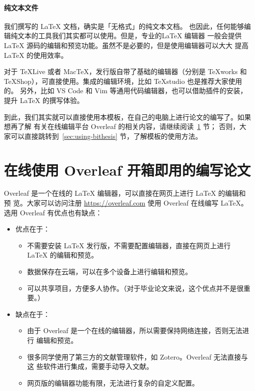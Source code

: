 \paragraph{纯文本文件} 我们撰写的 \LaTeX{} 文档，确实是「无格式」的纯文本文档。
也因此，任何能够编辑纯文本的工具我们其实都可以使用。但是，专业的\LaTeX{} 编辑器
一般会提供 \LaTeX{} 源码的编辑和预览功能。虽然不是必要的，但是使用编辑器可以大大
提高\LaTeX{} 的使用效率。

对于 \TeX{}Live 或者 Mac\TeX，发行版自带了基础的编辑器（分别是 \TeX{}works 和
\TeX{}Shop），可直接使用。集成的编辑环境，比如 \TeX{}studio 也是推荐大家使用的。
另外，比如 VS Code 和 Vim 等通用代码编辑器，也可以借助插件的安装，提升 \LaTeX{}
的撰写体验。

到此，我们其实就可以直接使用本模板，在自己的电脑上进行论文的编写了。如果想再了解
有关在线编辑平台 Overleaf 的相关内容，请继续阅读~\ref{sec:online-overleaf} 节；
否则，大家可以直接跳转到~\ref{sec:using-bithesis} 节，了解模板的使用方法。

\section{在线使用 Overleaf 开箱即用的编写论文}
\label{sec:online-overleaf}

Overleaf 是一个在线的 \LaTeX{} 编辑器，可以直接在网页上进行 \LaTeX{} 的编辑和预
览。大家可以访问注册 \url{https://overleaf.com} 使用 Overleaf 在线编写
\LaTeX{}。选用 Overleaf 有优点也有缺点：
\begin{itemize}[noitemsep]
  \item 优点在于：
    \begin{itemize}[noitemsep]
      \item 不需要安装 \LaTeX{} 发行版，不需要配置编辑器，直接在网页上进行
      \LaTeX{} 的编辑和预览。
      \item 数据保存在云端，可以在多个设备上进行编辑和预览。
      \item 可以共享项目，方便多人协作。（对于毕业论文来说，这个优点并不是很重
      要。）
    \end{itemize}
  \item 缺点在于：
    \begin{itemize}[noitemsep]
      \item 由于 Overleaf 是一个在线的编辑器，所以需要保持网络连接，否则无法进行
      编辑和预览。
      \item 很多同学使用了第三方的文献管理软件，如 Zotero。Overleaf 无法直接与这
      些软件进行集成，需要手动导入文献。
      \item 网页版的编辑器功能有限，无法进行复杂的自定义配置。
    \end{itemize}
\end{itemize}

